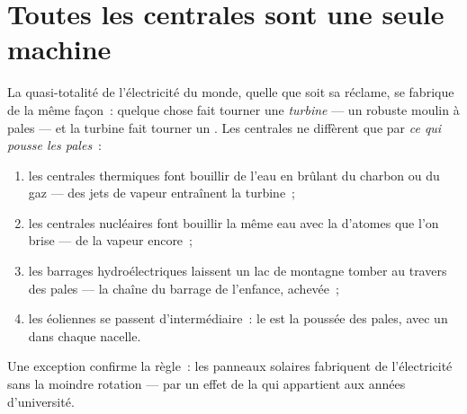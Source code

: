 \section{Toutes les centrales sont une seule machine}

\begin{proposition}\label{prop:g9:alternator:core}
La quasi-totalité de l'électricité du monde, quelle que soit sa
réclame, se fabrique de la même façon~: quelque chose fait tourner une
\emph{turbine} --- un robuste moulin à pales --- et la turbine fait
tourner un . Les centrales ne diffèrent que par \emph{ce
qui pousse les pales}~:
\begin{enumerate}
  \item les centrales thermiques font bouillir de l'eau en brûlant
        du charbon ou du gaz --- des jets de vapeur entraînent la
        turbine~;
  \item les centrales nucléaires font bouillir la même eau avec la
         d'atomes que l'on brise --- de la vapeur encore~;
  \item les barrages hydroélectriques laissent un lac de montagne
        tomber au travers des pales --- la chaîne du barrage de
        l'enfance, achevée~;
  \item les éoliennes se passent d'intermédiaire~: le  est la
        poussée des pales, avec un  dans chaque nacelle.
\end{enumerate}
Une exception confirme la règle~: les panneaux solaires fabriquent de
l'électricité sans la moindre rotation --- par un effet de la 
qui appartient aux années d'université.
\end{proposition}

